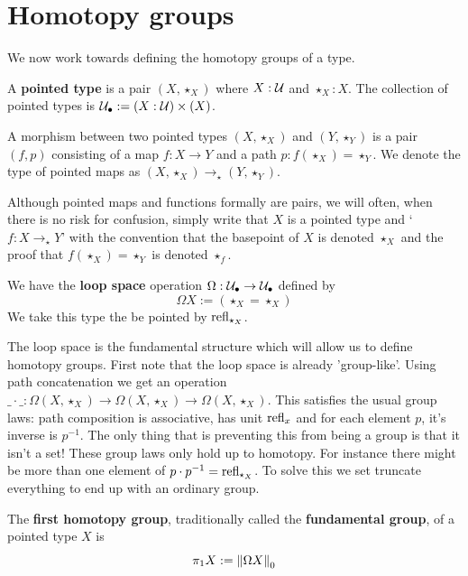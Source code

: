 \documentclass[10pt,oneside,leqno,openright]{memoir}
\begin{document}
\section{Homotopy groups}

We now work towards defining the homotopy groups of a type.

\begin{definition}
    A \textbf{pointed type} is a pair $(X, \star_X)$ where $X : \mathcal{U}$ and $\star_X : X$. The collection of pointed types is
    $ \mathcal{U}_{\bullet} := (X : \mathcal{U}) \times (X)$.

    A morphism between two pointed types $(X, \star_X)$ and $(Y, \star_Y)$ is a pair $(f, p)$ consisting of a map $f : X \to Y$ and a path $p : f(\star_X) = \star_Y$.
    We denote the type of pointed maps as $(X, \star_X) \to_\star (Y, \star_Y)$.
\end{definition}
\begin{convention}
  Although pointed maps and functions formally are pairs, we will often, when there is no risk for confusion, simply write that $X$ is a pointed type and `$f : X \to_\star Y$' with the convention that the basepoint of $X$ is denoted $\star_X$ and the proof that $f(\star_X) = \star_Y$ is denoted $\star_f$.
\end{convention}

\begin{definition}
    We have the \textbf{loop space} operation $\Omega : \mathcal{U}_{\bullet} \to \mathcal{U}_{\bullet}$ defined by
    \[ \Omega X := (\star_X = \star_X)\]
We take this type the be pointed by $\mathrm{refl}_{\star_X}$.
\end{definition}
%
The loop space is the fundamental structure which will allow us to define homotopy groups.
First note that the loop space is already 'group-like'.
Using path concatenation we get an operation $\_ \cdot \_ : \Omega(X, \star_X) \to \Omega(X, \star_X) \to \Omega(X, \star_X)$.
This satisfies the usual group laws: path composition is associative, has unit $\mathrm{refl}_x$ and for each element $p$, it's inverse is $p^{-1}$.
The only thing that is preventing this from being a group is that it isn't a set!
These group laws only hold up to homotopy.
For instance there might be more than one element of $p \cdot p^{-1} = \mathrm{refl}_{\star_X}$.
To solve this we set truncate everything to end up with an ordinary group.

\begin{definition}
    The \textbf{first homotopy group}, traditionally called the \textbf{fundamental group}, of a pointed type $X$ is
    \[ \pi_1 X := {\lVert\Omega X\rVert}_0\]
\end{definition}
\end{document}
